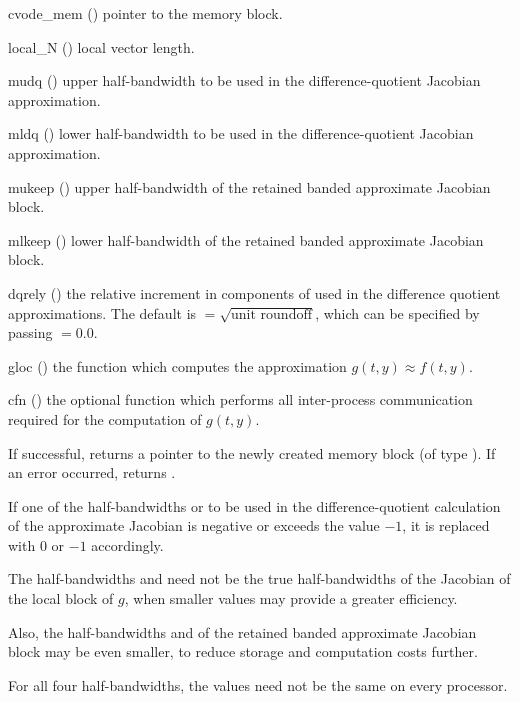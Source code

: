 {
  \begin{args}
  \item[cvode\_mem] ()
    pointer to the {\cvode} memory block.
  \item[local\_N] ()
    local vector length.
  \item[mudq] ()
    upper half-bandwidth to be used in the difference-quotient Jacobian approximation.
  \item[mldq] ()
    lower half-bandwidth to be used in the difference-quotient Jacobian approximation.
  \item[mukeep] ()
    upper half-bandwidth of the retained banded approximate Jacobian block.
  \item[mlkeep] ()
    lower half-bandwidth of the retained banded approximate Jacobian block.
  \item[dqrely] ()
    the relative increment in components of  used in the difference quotient
    approximations.  The default is $ = \sqrt{\text{unit roundoff}}$,
    which can be specified by passing $ = 0.0$.
  \item[gloc] ()
    the {\C} function which computes the approximation $g(t,y) \approx f(t,y)$. 
  \item[cfn] ()
    the optional {\C} function which performs all inter-process communication required for
    the computation of $g(t,y)$.
  \end{args}
}
{
  If successful,  returns a pointer to the newly created 
  {\cvbbdpre} memory block (of type ).
  If an error occurred,  returns .
}
{
  If one of the half-bandwidths  or  to be used in the 
  difference-quotient calculation of the approximate Jacobian is negative or 
  exceeds the value $-1$, it is replaced with 0 or
  $-1$ accordingly.

  The half-bandwidths  and  need not be the true 
  half-bandwidths of the Jacobian of the local block of $g$,    
  when smaller values may provide a greater efficiency.       

  Also, the half-bandwidths  and  of the retained 
  banded approximate Jacobian block may be even smaller,      
  to reduce storage and computation costs further.            

  For all four half-bandwidths, the values need not be the    
  same on every processor.
}
